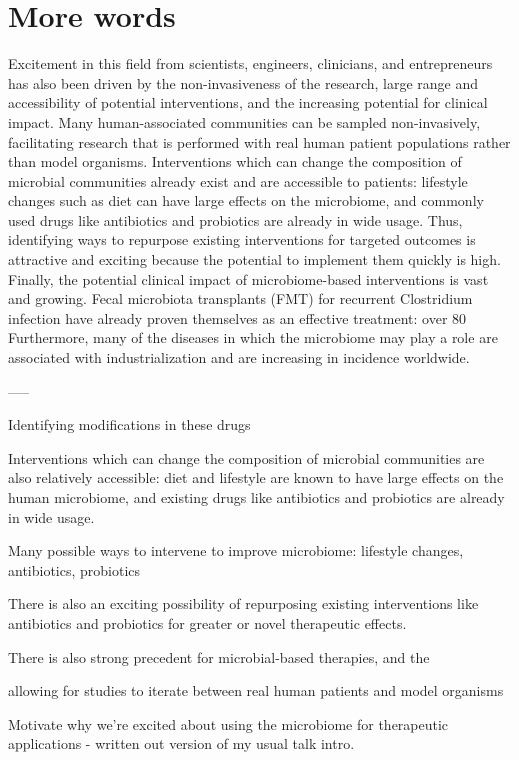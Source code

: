 \section{More words}


Excitement in this field from scientists, engineers, clinicians, and entrepreneurs has also been driven by the non-invasiveness of the research, large range and accessibility of potential interventions, and the increasing potential for clinical impact.
Many human-associated communities can be sampled non-invasively, facilitating research that is performed with real human patient populations rather than model organisms.
Interventions which can change the composition of microbial communities already exist and are accessible to patients: lifestyle changes such as diet can have large effects on the microbiome, and commonly used drugs like antibiotics and probiotics are already in wide usage.
Thus, identifying ways to repurpose existing interventions for targeted outcomes is attractive and exciting because the potential to implement them quickly is high.
Finally, the potential clinical impact of microbiome-based interventions is vast and growing.
Fecal microbiota transplants (FMT) for recurrent Clostridium infection have already proven themselves as an effective treatment: over 80%
Furthermore, many of the diseases in which the microbiome may play a role are associated with industrialization and are increasing in incidence worldwide.

-----

Identifying modifications in these drugs

Interventions which can change the composition of microbial communities are also relatively accessible: diet and lifestyle are known to have large effects on the human microbiome, and existing drugs like antibiotics and probiotics are already in wide usage.

Many possible ways to intervene to improve microbiome: lifestyle changes, antibiotics, probiotics

There is also an exciting possibility of repurposing existing interventions like antibiotics and probiotics for greater or novel therapeutic effects.

There is also strong precedent for microbial-based therapies, and the

allowing for studies to iterate between real human patients and model organisms

Motivate why we're excited about using the microbiome for therapeutic applications - written out version of my usual talk intro.

